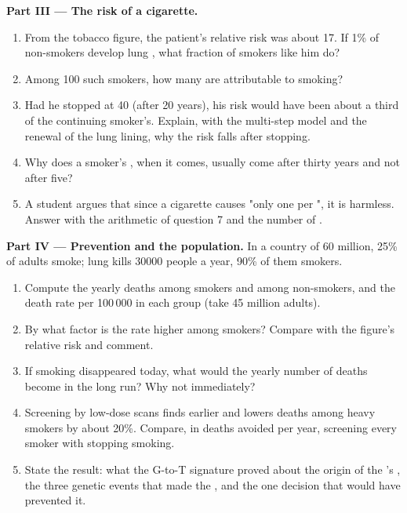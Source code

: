 \begin{problem}
\medskip
\noindent\textbf{Part III --- The risk of a cigarette.}
\begin{enumerate}[resume]
  \item From the tobacco figure, the patient's relative risk was
        about 17. If 1\% of non-smokers develop lung , what
        fraction of smokers like him do?
  \item Among 100 such smokers, how many  are attributable to
        smoking?
  \item Had he stopped at 40 (after 20 years), his risk would have
        been about a third of the continuing smoker's. Explain, with
        the multi-step model and the renewal of the lung lining, why
        the risk falls after stopping.
  \item Why does a smoker's , when it comes, usually come after
        thirty years and not after five?
  \item A student argues that since a cigarette causes "only one
         per ", it is harmless. Answer with the arithmetic
        of question 7 and the number of .
\end{enumerate}

\medskip
\noindent\textbf{Part IV --- Prevention and the population.}
In a country of 60 million, 25\% of adults smoke; lung  kills
$\num{30000}$ people a year, 90\% of them smokers.
\begin{enumerate}[resume]
  \item Compute the yearly  deaths among smokers and among
        non-smokers, and the death rate per 100\,000 in each group
        (take 45 million adults).
  \item By what factor is the rate higher among smokers? Compare with
        the figure's relative risk and comment.
  \item If smoking disappeared today, what would the yearly number of
         deaths become in the long run? Why not
        immediately?
  \item Screening by low-dose scans finds  earlier and lowers
        deaths among heavy smokers by about 20\%. Compare, in deaths
        avoided per year, screening every smoker with stopping
        smoking.
  \item State the result: what the G-to-T signature proved about the
        origin of the 's , the three genetic events
        that made the , and the one decision that would have
        prevented it.
\end{enumerate}
\end{problem}
